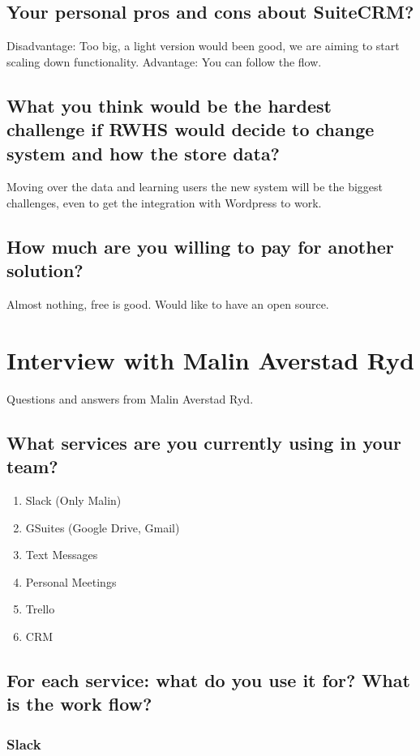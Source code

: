 \subsection{Your personal pros and cons about SuiteCRM?}
Disadvantage: Too big, a light version would been good, we are aiming to start scaling down functionality.
Advantage: You can follow the flow.

\subsection{What you think would be the hardest challenge if RWHS would decide to change system and how the store data?}
Moving over the data and learning users the new system will be the biggest challenges, even to get the integration with Wordpress to work.

\subsection{How much are you willing to pay for another solution?}
Almost nothing, free is good. Would like to have an open source.

\section{Interview with Malin Averstad Ryd}
\label{app:malin-averstad}
Questions and answers from Malin Averstad Ryd.

\subsection{What services are you currently using in your team?}

\begin{enumerate}
\item Slack (Only Malin)
\item GSuites (Google Drive, Gmail)
\item Text Messages
\item Personal Meetings
\item Trello
\item CRM
\end{enumerate}

\subsection{For each service: what do you use it for? What is the work flow?}

\subsubsection{Slack}
 
